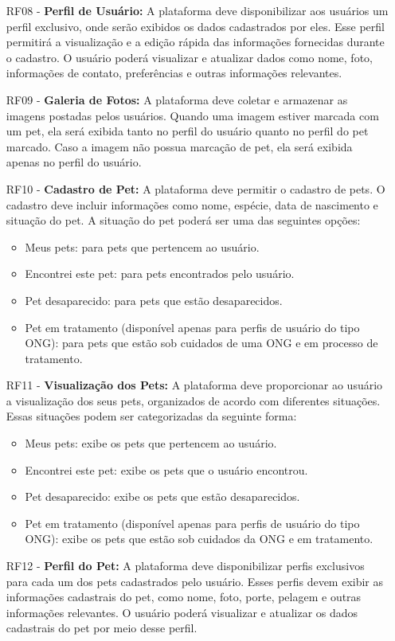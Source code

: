 \begin{itemize}[leftmargin=2cm]
\item[RF08 -] {\bf Perfil de Usuário:} A plataforma deve disponibilizar aos usuários um perfil exclusivo, onde serão exibidos os dados cadastrados por eles. Esse perfil permitirá a visualização e a edição rápida das informações fornecidas durante o cadastro. O usuário poderá visualizar e atualizar dados como nome, foto, informações de contato, preferências e outras informações relevantes.
\item[RF09 -] {\bf Galeria de Fotos:} A plataforma deve coletar e armazenar as imagens postadas pelos usuários. Quando uma imagem estiver marcada com um pet, ela será exibida tanto no perfil do usuário quanto no perfil do pet marcado. Caso a imagem não possua marcação de pet, ela será exibida apenas no perfil do usuário.
\item[RF10 -] {\bf Cadastro de Pet:} A plataforma deve permitir o cadastro de pets. O cadastro deve incluir informações como nome, espécie, data de nascimento e situação do pet. A situação do pet poderá ser uma das seguintes opções:
\begin{itemize}[leftmargin=2cm]
\item Meus pets: para pets que pertencem ao usuário.
\item Encontrei este pet: para pets encontrados pelo usuário.
\item Pet desaparecido: para pets que estão desaparecidos.
\item Pet em tratamento (disponível apenas para perfis de usuário do tipo ONG): para pets que estão sob cuidados de uma ONG e em processo de tratamento.
\end{itemize}
\item[RF11 -] {\bf Visualização dos Pets:} A plataforma deve proporcionar ao usuário a visualização dos seus pets, organizados de acordo com diferentes situações. Essas situações podem ser categorizadas da seguinte forma:
\begin{itemize}[leftmargin=2cm]
\item Meus pets: exibe os pets que pertencem ao usuário.
\item Encontrei este pet: exibe os pets que o usuário encontrou.
\item Pet desaparecido: exibe os pets que estão desaparecidos.
\item Pet em tratamento (disponível apenas para perfis de usuário do tipo ONG): exibe os pets que estão sob cuidados da ONG e em tratamento.
\end{itemize}
\item[RF12 -] {\bf Perfil do Pet:} A plataforma deve disponibilizar perfis exclusivos para cada um dos pets cadastrados pelo usuário. Esses perfis devem exibir as informações cadastrais do pet, como nome, foto, porte, pelagem e outras informações relevantes. O usuário poderá visualizar e atualizar os dados cadastrais do pet por meio desse perfil.

\end{itemize}
